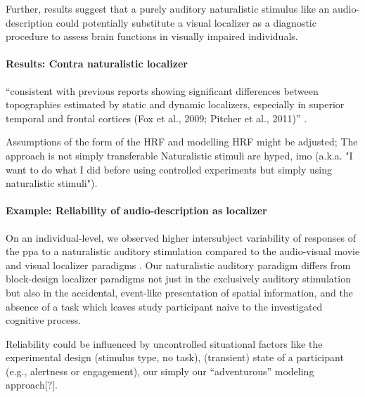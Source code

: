 Further, results suggest that a purely auditory naturalistic stimulus like an
audio-description could potentially substitute a visual localizer as a
diagnostic procedure to assess brain functions in visually impaired individuals.






\paragraph{Results: Contra naturalistic localizer}



``consistent with previous reports showing significant differences between
topographies estimated by static and dynamic localizers, especially in superior
temporal and frontal cortices (Fox et al., 2009; Pitcher et al., 2011)''
\citep{jiahui2022cross}.

%
Assumptions of the form of the HRF and modelling HRF  might be adjusted;
%
The approach is not simply transferable
%
Naturalistic stimuli are hyped, imo (a.k.a. "I want to do what I did before
using controlled experiments but simply using naturalistic stimuli").




\paragraph{Example: Reliability of audio-description as localizer}



On an individual-level, we observed higher intersubject variability of responses
of the \ac{ppa} to a naturalistic auditory stimulation compared to the
audio-visual movie and visual localizer paradigms \citep[cf. Table 3
in][]{sengupta2016extension}.
Our naturalistic auditory paradigm differs from block-design localizer paradigms
not just in the exclusively auditory stimulation but also in the accidental,
event-like presentation of spatial information, and the absence of a task which
leaves study participant naive to the investigated cognitive process.

%
Reliability could be influenced by uncontrolled situational factors like the
experimental design (stimulus type, no task), (transient) state of a participant
(e.g., alertness or engagement),  our simply our ``adventurous'' modeling
approach[?].


